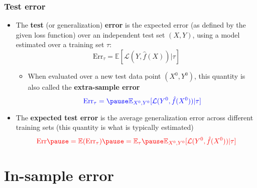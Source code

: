 \documentclass[smaller]{beamer}
\newcommand{\?}{\stackrel{?}{=}}
\newcommand{\rd}{\color{red}}
\newcommand{\bl}{\color{blue}}
\newcommand{\Err}{\text{Err}}
\begin{document}
\begin{frame}
  \frametitle{Test error}
  \pause

\begin{itemize} 

  \item The \textbf{test} (or generalization) \textbf{error} is the expected error (as defined by the given loss function) over an independent test set $(X, Y)$,
    using a model estimated over a training set $\tau$:\pause
    \begin{equation}
      \Err_\tau = \mathbb{E}[\mathcal{L}(Y, \hat f(X))|\tau]
    \end{equation}
    \pause
    
    \begin{itemize}
    \item When evaluated over a new test data point $(X^{0},Y^{0})$, this quantity is also called the \textbf{\bl extra-sample error}
      \pause
      \begin{equation}\bl
        \label{eq:20}
        \Err_\tau = \pause \mathbb{E}_{X^0,Y^0}[\mathcal{L}(Y^0, \hat f(X^0))|\tau]
      \end{equation}
    \end{itemize}
  \pause
  \item  The \textbf{\rd expected test error} is the average generalization error across different training sets (this quantity is what is typically estimated)
    \pause
    \begin{equation}
      \label{eq:21}\rd
      \Err \pause  = \mathbb{E}(\Err_\tau)  \pause = \mathbb{E}_{\tau}\pause \mathbb{E}_{X^0,Y^0}[\mathcal{L}(Y^0, \hat f(X^0))|\tau]
    \end{equation}
  \end{itemize}
%

\end{frame}




\section{In-sample error}
\end{document}
